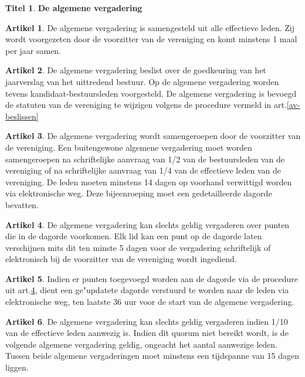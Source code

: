 \documentclass[a4paper,10pt]{article}
\theoremstyle{definition}
\newtheorem{titel}{\newline\Large Titel}
\newtheorem{artikel}{\large Artikel}
\newcommand{\ttext}[1]{\Large \textbf{#1} \normalsize}
\newcommand{\ttextcr}{\hfill\newline}
\begin{document}
\begin{titel}\ttext{De algemene vergadering}

  \begin{artikel}\ttextcr
    De algemene vergadering is samengesteld uit alle effectieve leden.
    Zij wordt voorgezeten door de voorzitter van de vereniging en komt minstens 1 maal per jaar samen.
  \end{artikel}

  \begin{artikel}\ttextcr
    De algemene vergadering beslist over de goedkeuring van het jaarverslag van het uittredend bestuur.
    Op de algemene vergadering worden tevens kandidaat-bestuursleden voorgesteld.
    De algemene vergadering is bevoegd de statuten van de vereniging te wijzigen volgens de procedure vermeld in art.\ref{av-beslissen}
  \end{artikel}

  \begin{artikel}\label{av-bijeenroeping}\ttextcr
    De algemene vergadering wordt samengeroepen door de voorzitter van de vereniging.
    Een buitengewone algemene vergadering moet worden samengeroepen na schriftelijke aanvraag van 1/2 van de bestuursleden van de vereniging of na schriftelijke aanvraag van 1/4 van de effectieve leden van de vereniging.
    De leden moeten minstens 14 dagen op voorhand verwittigd worden via elektronische weg.
    Deze bijeenroeping moet een gedetailleerde dagorde bevatten.
  \end{artikel}

  \begin{artikel}\label{av-dagorde}\ttextcr
    De algemene vergadering kan slechts geldig vergaderen over punten die in de dagorde voorkomen.
    Elk lid kan een punt op de dagorde laten verschijnen mits dit ten minste 5 dagen voor de vergadering schriftelijk of elektronisch bij de voorzitter van de vereniging wordt ingediend.
  \end{artikel}

  \begin{artikel}\ttextcr
    Indien er punten toegevoegd worden aan de dagorde via de procedure uit art.\ref{av-dagorde}, dient een ge"updatete dagorde verstuurd te worden naar de leden via elektronische weg, ten laatste 36 uur voor de start van de algemene vergadering.
  \end{artikel}

  \begin{artikel}\ttextcr
    De algemene vergadering kan slechts geldig vergaderen indien 1/10 van de effectieve leden aanwezig is.
    Indien dit quorum niet bereikt wordt, is de volgende algemene vergadering geldig, ongeacht het aantal aanwezige leden.
    Tussen beide algemene vergaderingen moet minstens een tijdspanne van 15 dagen liggen.
  \end{artikel}


\end{titel}
\end{document}
